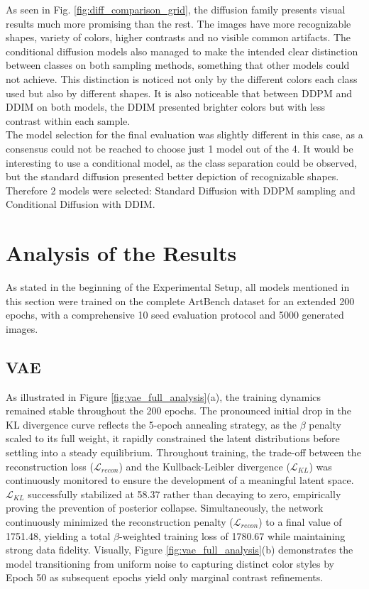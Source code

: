 \documentclass[runningheads]{llncs}
\begin{document}
\noindent
As seen in Fig. \ref{fig:diff_comparison_grid}, the diffusion family presents visual results much more promising than the rest. The images have more recognizable shapes, variety of colors, higher contrasts and no visible common artifacts. The conditional diffusion models also managed to make the intended clear distinction between classes on both sampling methods, something that other models could not achieve. This distinction is noticed not only by the different colors each class used but also by different shapes. It is also noticeable that between DDPM and DDIM on both models, the DDIM presented brighter colors but with less contrast within each sample.\\

\noindent
The model selection for the final evaluation was slightly different in this case, as a consensus could not be reached to choose just 1 model out of the 4. It would be interesting to use a conditional model, as the class separation could be observed, but the standard diffusion presented better depiction of recognizable shapes. Therefore 2 models were selected: Standard Diffusion with DDPM sampling and Conditional Diffusion with DDIM. 

\section{Analysis of the Results}
As stated in the beginning of the Experimental Setup, all models mentioned in this section were trained on the complete ArtBench dataset for an extended 200 epochs, with a comprehensive 10 seed evaluation protocol and 5000 generated images. 

\subsection{VAE}
\noindent
As illustrated in Figure \ref{fig:vae_full_analysis}(a), the training dynamics remained stable throughout the 200 epochs. The pronounced initial drop in the KL divergence curve reflects the 5-epoch annealing strategy, as the $\beta$ penalty scaled to its full weight, it rapidly constrained the latent distributions before settling into a steady equilibrium. Throughout training, the trade-off between the reconstruction loss ($\mathcal{L}_{recon}$) and the Kullback-Leibler divergence ($\mathcal{L}_{KL}$) was continuously monitored to ensure the development of a meaningful latent space. $\mathcal{L}_{KL}$ successfully stabilized at 58.37 rather than decaying to zero, empirically proving the prevention of posterior collapse. Simultaneously, the network continuously minimized the reconstruction penalty ($\mathcal{L}_{recon}$) to a final value of 1751.48, yielding a total $\beta$-weighted training loss of 1780.67 while maintaining strong data fidelity. Visually, Figure \ref{fig:vae_full_analysis}(b) demonstrates the model transitioning from uniform noise to capturing distinct color styles by Epoch 50 as subsequent epochs yield only marginal contrast refinements. 
\end{document}
